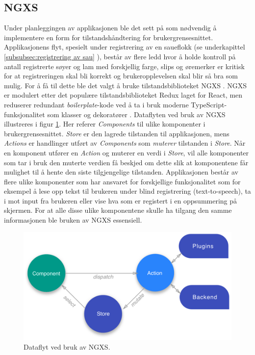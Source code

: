 \subsection{NGXS} \label{sub:ngxs}
Under planleggingen av applikasjonen ble det sett på som nødvendig å implementere en form for tilstandshåndtering for brukergrensesnittet. Applikasjonens flyt, spesielt under registrering av en saueflokk (se underkapittel \ref{subsubsec:registrering av sau} ), består av flere ledd hvor å holde kontroll på antall registrerte søyer og lam med forskjellig farge, slips og øremerker er kritisk for at registreringen skal bli korrekt og brukeropplevelsen skal blir så bra som mulig. For å få til dette ble det valgt å bruke tilstandsbiblioteket NGXS \cite{IntroductionNGXS}. NGXS er modulert etter det populære tilstandsbiblioteket Redux laget for React, men reduserer redundant \textit{boilerplate}-kode ved å ta i bruk moderne TypeScript-funksjonalitet som klasser og dekoratører \cite{IntroductionNGXS}. Dataflyten ved bruk av NGXS illustreres i figur \ref{fig:ngxs-illustration}. Her referer \textit{Components} til ulike komponenter i brukergrensesnittet. \textit{Store} er den lagrede  tilstanden til applikasjonen, mens \textit{Actions} er handlinger utført av \textit{Components} som \textit{muterer} tilstanden i \textit{Store}. Når en komponent utfører en \textit{Action} og muterer en verdi i \textit{Store}, vil alle komponenter som tar i bruk den muterte verdien få beskjed om dette slik at komponentene får mulighet til å hente den siste tilgjengelige tilstanden. Applikasjonen består av flere ulike komponenter som har ansvaret for forskjellige funksjonalitet som for eksempel å lese opp tekst til brukeren under blind registrering (text-to-speech), ta i mot input fra brukeren eller vise hva som er registert i en oppsummering på skjermen. For at alle disse ulike komponentene skulle ha tilgang den samme informasjonen ble bruken av NGXS essensiell.
\begin{figure}[H]
\centering
\captionsetup{width=.8\linewidth}
\includegraphics[scale=0.5]{Figurer/Bilder/ngxs-figure.png}
\caption{Dataflyt ved bruk av NGXS.}
\label{fig:ngxs-illustration}
\end{figure}

